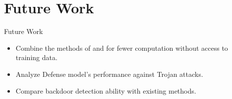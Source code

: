 \section{Future Work}
\begin{frame}{Future Work}
\justifying

\begin{itemize}
    \item Combine the methods of \citeauthor*{azizi2021tminer} and \citeauthor*{gao2019strip} for fewer computation without access to training data.
    \item Analyze Defense model's performance against Trojan attacks.
    \item Compare backdoor detection ability with existing methods.
\end{itemize}

\end{frame}